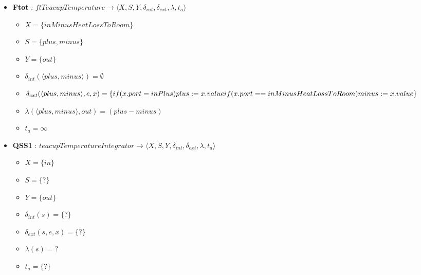 \begin{itemize}
	\item \textbf{Ftot} : $ ftTeacupTemperature \rightarrow \langle X, S, Y, \delta_{int}, \delta_{ext}, \lambda, t_{a} \rangle$ \newline
	\begin{itemize}
		\item $ X = \{ inMinusHeatLossToRoom \} $ \newline
		\item $ S = \{ plus, minus \} $ \newline
		\item $ Y = \{ out \} $ \newline
		\item $ \delta_{int}(\langle plus, minus \rangle) = \emptyset $ \newline
		\item $ \delta_{ext}(\langle plus, minus \rangle, e, x) = \{ 
		\\if (x.port = inPlus) plus := x.value
		\\if (x.port == inMinusHeatLossToRoom) minus := x.value
		\} $ \newline
		\item $ \lambda(\langle plus, minus \rangle, out) = (plus - minus) $ \newline
		\item $ t_{a} = \infty $ 
	\end{itemize}
	\item \textbf{QSS1} : $ teacupTemperatureIntegrator \rightarrow \langle X, S, Y, \delta_{int}, \delta_{ext}, \lambda, t_{a} \rangle$ \newline
	\begin{itemize}
		\item $ X = \{ in \} $ \newline
		\item $ S = \{ ? \} $ \newline
		\item $ Y = \{ out \} $ \newline
		\item $ \delta_{int}(s) = \{ ? \} $ \newline
		\item $ \delta_{ext}(s, e, x) = \{ ? \} $ \newline
		\item $ \lambda(s) = ? $ \newline
		\item $ t_{a} = \{ ? \} $ 
	\end{itemize}
\end{itemize}

